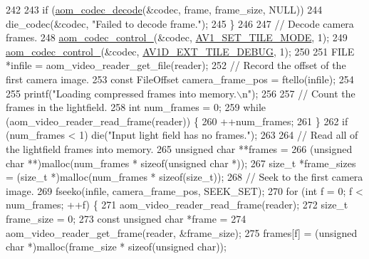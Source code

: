 \begin{DoxyCodeInclude}
{{{{{242 
243     \textcolor{keywordflow}{if} (\hyperlink{group__decoder_gab03fdb999d1f83a5896869a3ba5f68f7}{aom\_codec\_decode}(&codec, frame, frame\_size, NULL))
244       die\_codec(&codec, \textcolor{stringliteral}{"Failed to decode frame."});
245   \}
246 
247   \textcolor{comment}{// Decode camera frames.}
248   \hyperlink{group__codec_ga51eb332a40dcacc39000ab8e0be36b79}{aom\_codec\_control\_}(&codec, \hyperlink{group__aom__decoder_gga3865fd4b3192489baa9a5c3632ebe97ba0795d8084ae8c78528c01587198df9e2}{AV1\_SET\_TILE\_MODE}, 1);
249   \hyperlink{group__codec_ga51eb332a40dcacc39000ab8e0be36b79}{aom\_codec\_control\_}(&codec, \hyperlink{group__aom__decoder_gga3865fd4b3192489baa9a5c3632ebe97baffdaca91296725bd16142a33f3cc6522}{AV1D\_EXT\_TILE\_DEBUG}, 1);
250 
251   FILE *infile = aom\_video\_reader\_get\_file(reader);
252   \textcolor{comment}{// Record the offset of the first camera image.}
253   \textcolor{keyword}{const} FileOffset camera\_frame\_pos = ftello(infile);
254 
255   printf(\textcolor{stringliteral}{"Loading compressed frames into memory.\(\backslash\)n"});
256 
257   \textcolor{comment}{// Count the frames in the lightfield.}
258   \textcolor{keywordtype}{int} num\_frames = 0;
259   \textcolor{keywordflow}{while} (aom\_video\_reader\_read\_frame(reader)) \{
260     ++num\_frames;
261   \}
262   \textcolor{keywordflow}{if} (num\_frames < 1) die(\textcolor{stringliteral}{"Input light field has no frames."});
263 
264   \textcolor{comment}{// Read all of the lightfield frames into memory.}
265   \textcolor{keywordtype}{unsigned} \textcolor{keywordtype}{char} **frames =
266       (\textcolor{keywordtype}{unsigned} \textcolor{keywordtype}{char} **)malloc(num\_frames * \textcolor{keyword}{sizeof}(\textcolor{keywordtype}{unsigned} \textcolor{keywordtype}{char} *));
267   \textcolor{keywordtype}{size\_t} *frame\_sizes = (\textcolor{keywordtype}{size\_t} *)malloc(num\_frames * \textcolor{keyword}{sizeof}(\textcolor{keywordtype}{size\_t}));
268   \textcolor{comment}{// Seek to the first camera image.}
269   fseeko(infile, camera\_frame\_pos, SEEK\_SET);
270   \textcolor{keywordflow}{for} (\textcolor{keywordtype}{int} f = 0; f < num\_frames; ++f) \{
271     aom\_video\_reader\_read\_frame(reader);
272     \textcolor{keywordtype}{size\_t} frame\_size = 0;
273     \textcolor{keyword}{const} \textcolor{keywordtype}{unsigned} \textcolor{keywordtype}{char} *frame =
274         aom\_video\_reader\_get\_frame(reader, &frame\_size);
275     frames[f] = (\textcolor{keywordtype}{unsigned} \textcolor{keywordtype}{char} *)malloc(frame\_size * \textcolor{keyword}{sizeof}(\textcolor{keywordtype}{unsigned} \textcolor{keywordtype}{char}));
}}}}}
\end{DoxyCodeInclude}
